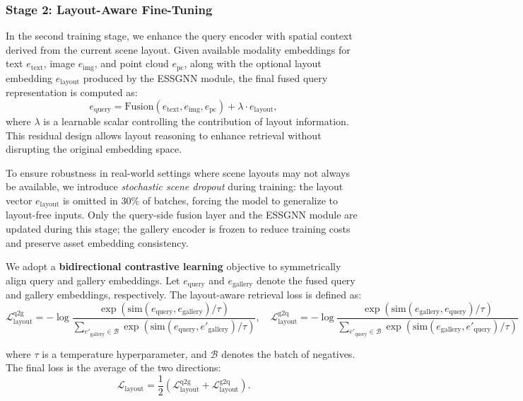 \subsubsection*{Stage 2: Layout-Aware Fine-Tuning}
In the second training stage, we enhance the query encoder with spatial context derived from the current scene layout. Given available modality embeddings for text \(e_{\text{text}}\), image \(e_{\text{img}}\), and point cloud \(e_{\text{pc}}\), along with the optional layout embedding \(e_{\text{layout}}\) produced by the ESSGNN module, the final fused query representation is computed as:
\begin{equation}
    e_{\text{query}} = \text{Fusion}(e_{\text{text}}, e_{\text{img}}, e_{\text{pc}}) + \lambda \cdot e_{\text{layout}},
\end{equation}
where \(\lambda\) is a learnable scalar controlling the contribution of layout information. This residual design allows layout reasoning to enhance retrieval without disrupting the original embedding space.

To ensure robustness in real-world settings where scene layouts may not always be available, we introduce \textit{stochastic scene dropout} during training: the layout vector \(e_{\text{layout}}\) is omitted in 30\% of batches, forcing the model to generalize to layout-free inputs. Only the query-side fusion layer and the ESSGNN module are updated during this stage; the gallery encoder is frozen to reduce training costs and preserve asset embedding consistency.

We adopt a \textbf{bidirectional contrastive learning} objective to symmetrically align query and gallery embeddings. Let \(e_{\text{query}}\) and \(e_{\text{gallery}}\) denote the fused query and gallery embeddings, respectively. The layout-aware retrieval loss is defined as:
{\small
\begin{equation}
    \mathcal{L}_{\text{layout}}^{\text{q2g}} = -\log \frac{\exp(\text{sim}(e_{\text{query}}, e_{\text{gallery}}) / \tau)}{\sum_{e'_{\text{gallery}} \in \mathcal{B}} \exp(\text{sim}(e_{\text{query}}, e'_{\text{gallery}}) / \tau)}, \quad
    \mathcal{L}_{\text{layout}}^{\text{g2q}} = -\log \frac{\exp(\text{sim}(e_{\text{gallery}}, e_{\text{query}}) / \tau)}{\sum_{e'_{\text{query}} \in \mathcal{B}} \exp(\text{sim}(e_{\text{gallery}}, e'_{\text{query}}) / \tau)}
\end{equation}
}

where \(\tau\) is a temperature hyperparameter, and \(\mathcal{B}\) denotes the batch of negatives. The final loss is the average of the two directions:
\begin{equation}
    \mathcal{L}_{\text{layout}} = \frac{1}{2} \left( \mathcal{L}_{\text{layout}}^{\text{q2g}} + \mathcal{L}_{\text{layout}}^{\text{g2q}} \right).
\end{equation}

